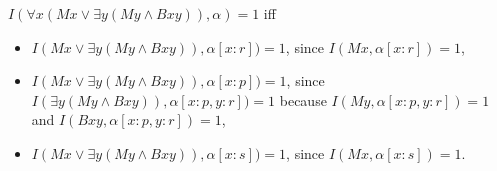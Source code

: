 \begin{enumerate}[label=\alph*)]
$I(\forall x (Mx \lor \exists y (My \land Bxy)), \alpha) = 1$ iff
\vspace{-\parskip}
\begin{itemize}[noitemsep, leftmargin=*]
\item $I(Mx \lor \exists y (My \land Bxy)), \alpha[x : r]) = 1$, since $I(Mx, \alpha[x : r]) = 1$,
\item $I(Mx \lor \exists y (My \land Bxy)), \alpha[x : p]) = 1$, since $I(\exists y (My \land Bxy)), \alpha[x : p, y : r]) = 1$ because $I(My, \alpha[x : p, y : r]) = 1$ and $I(Bxy, \alpha[x : p, y : r]) = 1$,
\item $I(Mx \lor \exists y (My \land Bxy)), \alpha[x : s]) = 1$, since $I(Mx, \alpha[x : s]) = 1$.
\end{itemize}

\end{enumerate}